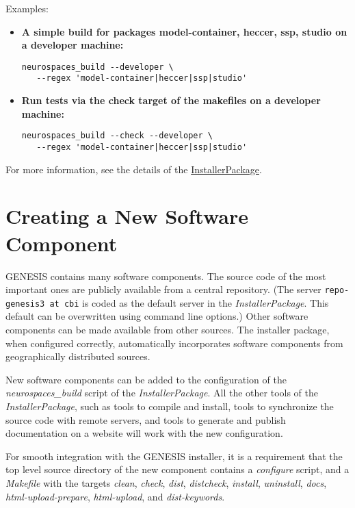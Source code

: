 \documentclass[12pt]{article}
\begin{document}
Examples:

\begin{itemize}

\item {\bf A simple build for packages model-container, heccer, ssp, studio on a developer machine:}
\begin{verbatim}
neurospaces_build --developer \
   --regex 'model-container|heccer|ssp|studio'
\end{verbatim}

\item {\bf Run tests via the check target of the makefiles on a developer machine:}
\begin{verbatim}
neurospaces_build --check --developer \
   --regex 'model-container|heccer|ssp|studio'
\end{verbatim}
\end{itemize}

For more information, see the details of the \href{../installer-package/installer-package.tex}{InstallerPackage}. 

\section*{Creating a New Software Component}

GENESIS contains many software components. The source code of the most important ones are publicly available from a central repository. (The server {\tt repo-genesis3 at cbi} is coded as the default server in the {\it InstallerPackage}. This default can be overwritten using command line options.) Other software components can be made available from other sources. The installer package, when configured correctly, automatically incorporates software components from geographically distributed sources.

New software components can be added to the configuration of the {\it neurospaces\_build} script of the {\it InstallerPackage}. All the other tools of the {\it InstallerPackage}, such as tools to compile and install, tools to synchronize the source code with remote servers, and tools to generate and publish documentation on a website will work with the new configuration.

For smooth integration with the GENESIS installer, it is a requirement that the top level source directory of the new component contains a {\it configure} script, and a {\it Makefile} with the targets {\it clean}, {\it check}, {\it dist}, {\it distcheck}, {\it install}, {\it uninstall}, {\it docs}, {\it html-upload-prepare}, {\it html-upload}, and {\it dist-keywords}.
\end{document}

